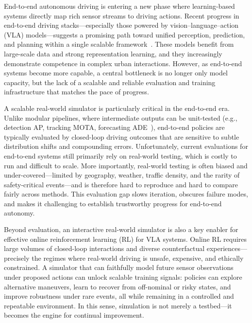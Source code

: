 End-to-end autonomous driving is entering a new phase where learning-based systems directly map rich sensor streams to driving actions. Recent progress in end-to-end driving stacks—especially those powered by vision–language–action (VLA) models—suggests a promising path toward unified perception, prediction, and planning within a single scalable framework~\cite{intelligence2025pi05visionlanguageactionmodelopenworld,black2026pi0visionlanguageactionflowmodel,hwang2024emma}. These models benefit from large-scale data and strong representation learning, and they increasingly demonstrate competence in complex urban interactions. However, as end-to-end systems become more capable, a central bottleneck is no longer only model capacity, but the lack of a scalable and reliable evaluation and training infrastructure that matches the pace of progress.

A scalable real-world simulator is particularly critical in the end-to-end era. Unlike modular pipelines, where intermediate outputs can be unit-tested (e.g., detection AP, tracking MOTA, forecasting ADE~\cite{fong2021panoptic,nuscenes2019,WaymoWorldModel2026}), end-to-end policies are typically evaluated by closed-loop driving outcomes that are sensitive to subtle distribution shifts and compounding errors. Unfortunately, current evaluations for end-to-end systems still primarily rely on real-world testing, which is costly to run and difficult to scale. More importantly, real-world testing is often biased and under-covered—limited by geography, weather, traffic density, and the rarity of safety-critical events—and is therefore hard to reproduce and hard to compare fairly across methods. This evaluation gap slows iteration, obscures failure modes, and makes it challenging to establish trustworthy progress for end-to-end autonomy.

Beyond evaluation, an interactive real-world simulator is also a key enabler for effective online reinforcement learning (RL) for VLA systems. Online RL requires large volumes of closed-loop interactions and diverse counterfactual experiences—precisely the regimes where real-world driving is unsafe, expensive, and ethically constrained. A simulator that can faithfully model future sensor observations under proposed actions can unlock scalable training signals: policies can explore alternative maneuvers, learn to recover from off-nominal or risky states, and improve robustness under rare events, all while remaining in a controlled and repeatable environment. In this sense, simulation is not merely a testbed—it becomes the engine for continual improvement.

